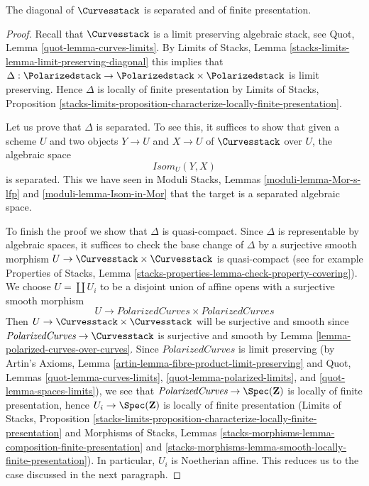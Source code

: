 %
\begin{lemma}
\label{lemma-curves-diagonal-separated-fp}
The diagonal of $\Curvesstack$ is separated
and of finite presentation.
\end{lemma}

\begin{proof}
Recall that $\Curvesstack$ is a limit preserving algebraic stack, see
Quot, Lemma \ref{quot-lemma-curves-limits}.
By Limits of Stacks, Lemma \ref{stacks-limits-lemma-limit-preserving-diagonal}
this implies that
$\Delta : \Polarizedstack \to \Polarizedstack \times \Polarizedstack$
is limit preserving. Hence $\Delta$ is locally of finite presentation
by Limits of Stacks, Proposition
\ref{stacks-limits-proposition-characterize-locally-finite-presentation}.

\medskip\noindent
Let us prove that $\Delta$ is separated. To see this, it suffices to show
that given a scheme $U$ and two objects $Y \to U$ and $X \to U$ of
$\Curvesstack$ over $U$, the algebraic space
$$
\mathit{Isom}_U(Y, X)
$$
is separated. This we have seen in
Moduli Stacks, Lemmas \ref{moduli-lemma-Mor-s-lfp} and
\ref{moduli-lemma-Isom-in-Mor} that the target is
a separated algebraic space.

\medskip\noindent
To finish the proof we show that $\Delta$ is quasi-compact. Since
$\Delta$ is representable by algebraic spaces, it suffices to check
the base change of $\Delta$ by a surjective smooth morphism
$U \to \Curvesstack \times \Curvesstack$ is quasi-compact
(see for example Properties of Stacks, Lemma
\ref{stacks-properties-lemma-check-property-covering}).
We choose $U = \coprod U_i$ to be a disjoint union of affine opens
with a surjective smooth morphism
$$
U \longrightarrow
\textit{PolarizedCurves} \times \textit{PolarizedCurves}
$$
Then $U \to \Curvesstack \times \Curvesstack$ will be surjective
and smooth since $\textit{PolarizedCurves} \to \Curvesstack$
is surjective and smooth by Lemma \ref{lemma-polarized-curves-over-curves}.
Since $\textit{PolarizedCurves}$ is limit preserving
(by Artin's Axioms, Lemma \ref{artin-lemma-fibre-product-limit-preserving}
and Quot, Lemmas \ref{quot-lemma-curves-limits},
\ref{quot-lemma-polarized-limits}, and
\ref{quot-lemma-spaces-limits}), we
see that $\textit{PolarizedCurves} \to \Spec(\mathbf{Z})$ is locally of
finite presentation, hence $U_i \to \Spec(\mathbf{Z})$ is
locally of finite presentation
(Limits of Stacks, Proposition
\ref{stacks-limits-proposition-characterize-locally-finite-presentation}
and Morphisms of Stacks, Lemmas
\ref{stacks-morphisms-lemma-composition-finite-presentation} and
\ref{stacks-morphisms-lemma-smooth-locally-finite-presentation}).
In particular, $U_i$ is Noetherian affine. This reduces us to the
case discussed in the next paragraph.


\end{proof}
